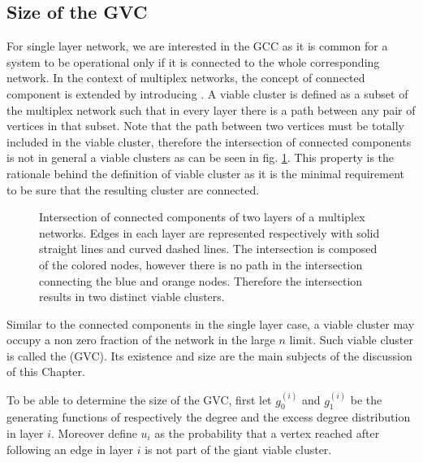 \documentclass[
11pt, %
english, %
singlespacing, %
nolistspacing, %
liststotoc, %
headsepline, %
]{MastersDoctoralThesis} %
\begin{document}
\subsection{Size of the GVC}
\label{Section: Size of GVC}

For single layer network, we are interested in the GCC as it is common for a system to be operational only if it is connected to the whole corresponding network. In the context of multiplex networks, the concept of connected component is extended by introducing . A viable cluster is defined as a subset of the multiplex network such that in every layer there is a path between any pair of vertices in that subset. Note that the path between two vertices must be totally included in the viable cluster, therefore the intersection of connected components is not in general a viable clusters as can be seen in fig. \ref{Figure: Intersection of connected is not viable}. This property is the rationale behind the definition of viable cluster as it is the minimal requirement to be sure that the resulting cluster are connected.

\begin{figure}
	
	\caption{Intersection of connected components of two layers of a multiplex networks. Edges in each layer are represented respectively with solid straight lines and curved dashed lines. The intersection is composed of the colored nodes, however there is no path in the intersection connecting the blue and orange nodes. Therefore the intersection results in two distinct viable clusters.}
	\label{Figure: Intersection of connected is not viable}
\end{figure}

Similar to the connected components in the single layer case, a viable cluster may occupy a non zero fraction of the network in the large $n$ limit. Such viable cluster is called the  (GVC). Its existence and size are the main subjects of the discussion of this Chapter.

To be able to determine the size of the GVC, first let $g_0^{(i)}$ and $g_1^{(i)}$ be the generating functions of respectively the degree and the excess degree distribution in layer $i$. Moreover define $u_i$ as the probability that a vertex reached after following an edge in layer $i$ is not part of the giant viable cluster.
\end{document}
